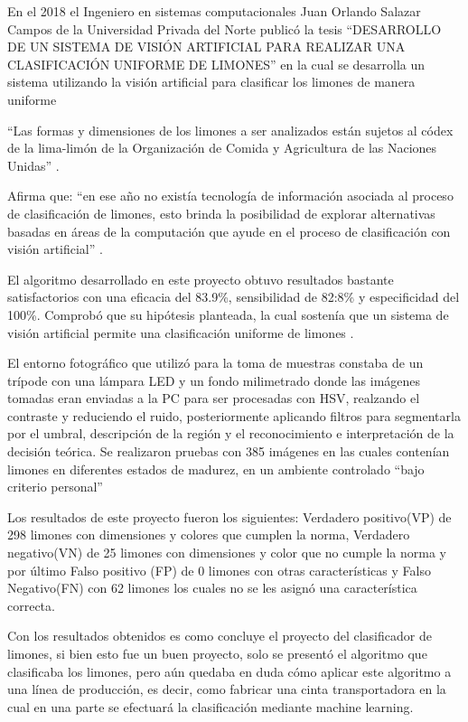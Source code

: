 En el 2018 el Ingeniero en sistemas computacionales Juan Orlando Salazar Campos de la Universidad Privada del Norte publicó la tesis “DESARROLLO DE UN SISTEMA DE VISIÓN ARTIFICIAL PARA REALIZAR UNA CLASIFICACIÓN UNIFORME DE LIMONES” en la cual se desarrolla un sistema utilizando la visión artificial para clasificar los limones de manera uniforme

“Las formas y dimensiones de los limones a ser analizados están sujetos al códex de la lima-limón de la Organización de Comida y Agricultura de las Naciones Unidas” \cite{Vision}.

Afirma que: “en ese año no existía tecnología de información asociada al proceso de clasificación de limones, esto brinda la posibilidad de explorar alternativas basadas en áreas de la computación que ayude en el proceso de clasificación con visión artificial” \cite{Vision}.

El algoritmo desarrollado en este proyecto obtuvo resultados bastante satisfactorios con una eficacia del 83.9\%, sensibilidad de 82:8\% y especificidad del 100\%. Comprobó que su hipótesis planteada, la cual sostenía que un sistema de visión artificial permite una clasificación uniforme de limones \cite{Vision}.

El entorno fotográfico que utilizó para la toma de muestras constaba de un trípode con una lámpara LED y un fondo milimetrado donde las imágenes tomadas eran enviadas a la PC para ser procesadas con HSV, realzando el contraste y reduciendo el ruido, posteriormente aplicando filtros para segmentarla por el umbral, descripción de la región y el reconocimiento e interpretación de la decisión teórica.
Se realizaron pruebas con 385 imágenes en las cuales contenían limones en diferentes estados de madurez, en un ambiente controlado “bajo criterio personal”

Los resultados de este proyecto fueron los siguientes: Verdadero positivo(VP) de 298 limones con dimensiones y colores que cumplen la norma, Verdadero negativo(VN) de 25 limones con dimensiones y color que no cumple la norma y por último Falso positivo (FP) de 0 limones con otras características y Falso Negativo(FN) con 62 limones los cuales no se les asignó una característica correcta.

Con los resultados obtenidos es como concluye el proyecto del clasificador de limones, si bien esto fue un buen proyecto, solo se presentó el algoritmo que clasificaba los limones, pero aún quedaba en duda cómo aplicar este algoritmo a una línea de producción, es decir, como fabricar una cinta transportadora en la cual en una parte se efectuará la clasificación mediante machine learning.

